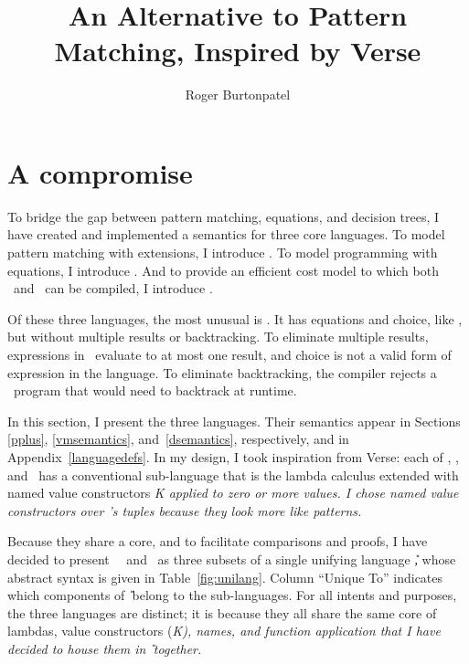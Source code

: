 \documentclass[manuscript,screen,review, 12pt, nonacm]{acmart}
\title{An Alternative to Pattern Matching, Inspired by Verse}
\author{Roger Burtonpatel}
\affiliation{%
\institution{Tufts University}
\streetaddress{419 Boston Ave}
  \city{Medford}
  \state{Massachusetts}
  \country{USA}
  \postcode{02155}
  }
\begin{document}
  
\section{A compromise}
    
    To bridge the gap between pattern matching, equations, and decision trees, I
    have created and implemented a semantics for three core languages. To model
    pattern matching with extensions, I introduce \PPlus. To model programming
    with equations, I introduce \VMinus. And to provide an
    efficient cost model to which both \PPlus\ and \VMinus\ can be compiled, I
    introduce \D.

    Of these three languages, the most unusual is \VMinus. It has equations and
    choice, like \VC, but without multiple results or backtracking. To eliminate
    multiple results, expressions in \VMinus\ evaluate to at most one result,
    and choice is not a valid form of expression in the language. To eliminate
    backtracking, the compiler rejects a \VMinus\ program that would need to
    backtrack at runtime. 
    

    In this section, I present the three languages. Their semantics appear in
    Sections \ref{pplus}, \ref{vmsemantics}, and~\ref{dsemantics},
    respectively, and in Appendix~\ref{languagedefs}. In my design, I took
    inspiration from Verse: each of \PPlus, \VMinus, and \D\ has a conventional
    sub-language that is the lambda calculus extended with named value
    constructors \it{K} applied to zero or more values. I chose named value
    constructors over \VC's tuples because they look more like patterns. 
    
    Because they share a core, and to facilitate comparisons and proofs, I have
    decided to present \VMinus\, \PPlus\, and \D\ as three subsets of a single
    unifying language \U, whose abstract syntax is given in
    Table~\ref{fig:unilang}. Column “Unique To” indicates which components of
    \U\ belong to the sub-languages. For all intents and purposes, the three
    languages are distinct; it is because they all share the same core of
    lambdas, value constructors (\it{K}), names, and function application that I
    have decided to house them in \U\ together. 
    
\end{document}
